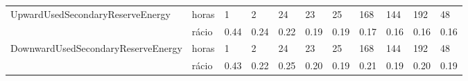 \begin{tabular}{lllllllllll}
\toprule
\midrule
\multirow[t]{2}{*}{UpwardUsedSecondaryReserveEnergy} & horas & 1 & 2 & 24 & 23 & 25 & 168 & 144 & 192 & 48 \\
 & rácio & 0.44 & 0.24 & 0.22 & 0.19 & 0.19 & 0.17 & 0.16 & 0.16 & 0.16 \\
\cline{1-11}
\multirow[t]{2}{*}{DownwardUsedSecondaryReserveEnergy} & horas & 1 & 2 & 24 & 23 & 25 & 168 & 144 & 192 & 48 \\
 & rácio & 0.43 & 0.22 & 0.25 & 0.20 & 0.19 & 0.21 & 0.19 & 0.20 & 0.19 \\
\cline{1-11}
\bottomrule
\end{tabular}
